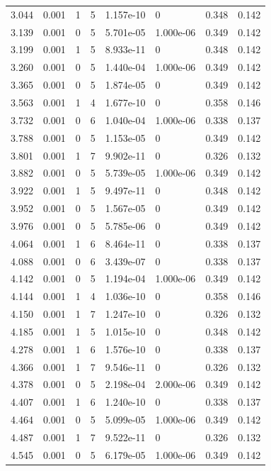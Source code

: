 \documentclass[preview]{standalone}
\begin{document}
{{\begin{tabular}{L{1.2cm}C{1.2cm} C{0.3cm}C{0.5cm} C{1.4cm}C{1.4cm} C{1.4cm}C{1.4cm}}
  3.044  &  0.001  & 1     &  5 &  1.157e-10  & 0  & 0.348 &  0.142   \\ 
  3.139  &  0.001  & 0     &  5 &  5.701e-05  & 1.000e-06  & 0.349 &  0.142   \\ 
  3.199  &  0.001  & 1     &  5 &  8.933e-11  & 0  & 0.348 &  0.142   \\ 
  3.260  &  0.001  & 0     &  5 &  1.440e-04  & 1.000e-06  & 0.349 &  0.142   \\ 
  3.365  &  0.001  & 0     &  5 &  1.874e-05  & 0  & 0.349 &  0.142   \\ 
  3.563  &  0.001  & 1     &  4 &  1.677e-10  & 0  & 0.358 &  0.146   \\ 
  3.732  &  0.001  & 0     &  6 &  1.040e-04  & 1.000e-06  & 0.338 &  0.137   \\ 
  3.788  &  0.001  & 0     &  5 &  1.153e-05  & 0  & 0.349 &  0.142   \\ 
  3.801  &  0.001  & 1     &  7 &  9.902e-11  & 0  & 0.326 &  0.132   \\ 
  3.882  &  0.001  & 0     &  5 &  5.739e-05  & 1.000e-06  & 0.349 &  0.142   \\ 
  3.922  &  0.001  & 1     &  5 &  9.497e-11  & 0  & 0.348 &  0.142   \\ 
  3.952  &  0.001  & 0     &  5 &  1.567e-05  & 0  & 0.349 &  0.142   \\ 
  3.976  &  0.001  & 0     &  5 &  5.785e-06  & 0  & 0.349 &  0.142   \\ 
  4.064  &  0.001  & 1     &  6 &  8.464e-11  & 0  & 0.338 &  0.137   \\ 
  4.088  &  0.001  & 0     &  6 &  3.439e-07  & 0  & 0.338 &  0.137   \\ 
  4.142  &  0.001  & 0     &  5 &  1.194e-04  & 1.000e-06  & 0.349 &  0.142   \\ 
  4.144  &  0.001  & 1     &  4 &  1.036e-10  & 0  & 0.358 &  0.146   \\ 
  4.150  &  0.001  & 1     &  7 &  1.247e-10  & 0  & 0.326 &  0.132   \\ 
  4.185  &  0.001  & 1     &  5 &  1.015e-10  & 0  & 0.348 &  0.142   \\ 
  4.278  &  0.001  & 1     &  6 &  1.576e-10  & 0  & 0.338 &  0.137   \\ 
  4.366  &  0.001  & 1     &  7 &  9.546e-11  & 0  & 0.326 &  0.132   \\ 
  4.378  &  0.001  & 0     &  5 &  2.198e-04  & 2.000e-06  & 0.349 &  0.142   \\ 
  4.407  &  0.001  & 1     &  6 &  1.240e-10  & 0  & 0.338 &  0.137   \\ 
  4.464  &  0.001  & 0     &  5 &  5.099e-05  & 1.000e-06  & 0.349 &  0.142   \\ 
  4.487  &  0.001  & 1     &  7 &  9.522e-11  & 0  & 0.326 &  0.132   \\ 
  4.545  &  0.001  & 0     &  5 &  6.179e-05  & 1.000e-06  & 0.349 &  0.142   \\ 
\hline 
\end{tabular} 

}}
\end{document}
